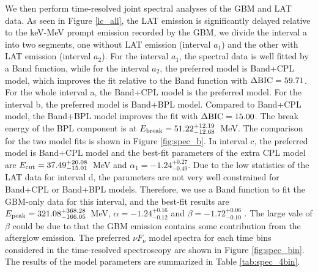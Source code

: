 \documentclass[twocolumn]{aastex631}
\begin{document}
We then perform  time-resolved joint spectral analyses of the GBM and LAT data.
As seen in Figure \ref{lc_all}, the LAT emission is significantly delayed relative to the keV-MeV prompt emission recorded by the GBM,  we divide the interval a into two segments, one without LAT emission (interval $a_1$) and the other with LAT emission (interval $a_2$).
For the interval $a_1$, the spectral data is well fitted by a Band function, while for the interval $a_2$, the preferred model is Band+CPL model, which improves the fit relative to the Band function with $\Delta \rm BIC = 59.71$. For the whole interval a, the Band+CPL model is the preferred model.
For the interval b, the preferred model is Band+BPL model. Compared to Band+CPL model, the Band+BPL model improves the fit with $\Delta \rm BIC = 15.00$. The break energy of the BPL component is at $E_{\rm break} = 51.22^{+12.19}_{-12.68}$~MeV. The comparison for the two model fits is shown in  Figure \ref{fig:spec_b}.  In interval c, the preferred model is Band+CPL model and the best-fit parameters of the extra CPL model are $E_{\rm cut} = 37.49^{+20.08}_{-15.01}$~MeV and $\alpha_1=-1.24^{+0.27}_{-0.49}$. 
Due to the low statistics of the LAT data for interval d, the parameters are not very well constrained for Band+CPL or Band+BPL models. Therefore, we use a Band function to fit the GBM-only data for this interval, and the best-fit results are $E_{\rm peak}=321.08_{-166.05}^{+368.28}$~MeV, $\alpha=-1.24_{-0.12}^{+0.16}$ and $\beta=-1.72_{-0.10}^{+0.06}$ . The large vale of $\beta$ could be due to that the GBM emission contains some contribution from the afterglow emission. 
The preferred $\nu F_\nu$ model spectra  for each time bins considered in the time-resolved spectroscopy are shown in Figure \ref{fig:spec_bin}. The results of the model parameters are summarized in Table \ref{tab:spec_4bin}.
\end{document}
